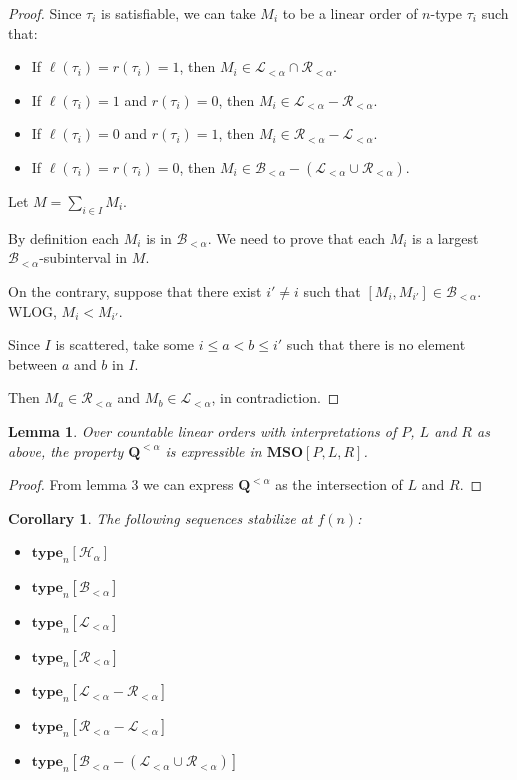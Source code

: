 \documentclass{article}
\newtheorem{corollary}{Corollary}
\newtheorem{lemma}{Lemma}
\newcommand{\brackets}[1]{\left[ {#1} \right]}
\newcommand{\mso}{\mathbf{MSO}}
\newcommand{\qq}{\mathbf{Q}}
\newcommand{\type}[2]{\mathbf{type}_{#1} \brackets{#2}}
\begin{document}
\begin{proof}
  Since $\tau_i$ is satisfiable, we can take $M_i$ to be a linear order of $n$-type
  $\tau_i$ such that:

  \begin{itemize}
    \item If $\ell(\tau_i) = r(\tau_i) = 1$, then $M_i \in \mathcal{L}_{< \alpha} \cap \mathcal{R}_{< \alpha}$.
    \item If $\ell(\tau_i) = 1$ and $r(\tau_i) = 0$, then $M_i \in \mathcal{L}_{< \alpha} - \mathcal{R}_{< \alpha}$.
    \item If $\ell(\tau_i) = 0$ and $r(\tau_i) = 1$, then $M_i \in \mathcal{R}_{< \alpha} - \mathcal{L}_{< \alpha}$.
    \item If $\ell(\tau_i) = r(\tau_i) = 0$, then $M_i \in \mathcal{B}_{< \alpha} - (\mathcal{L}_{< \alpha} \cup \mathcal{R}_{< \alpha})$.
  \end{itemize}

  Let $M = \sum_{i \in I} M_i$.

  By definition each $M_i$ is in $\mathcal{B}_{< \alpha}$. We need to prove
  that each $M_i$ is a largest $\mathcal{B}_{< \alpha}$-subinterval in $M$.

  On the contrary, suppose that there exist $i' \ne i$ such that $[M_i, M_{i'}] \in \mathcal{B}_{< \alpha}$.
  WLOG, $M_i < M_{i'}$.

  Since $I$ is scattered, take some $i \le a < b \le i'$ such that
  there is no element between $a$ and $b$ in $I$.

  Then $M_a \in \mathcal{R}_{< \alpha}$ and $M_b \in \mathcal{L}_{< \alpha}$, in contradiction.
\end{proof}

\begin{lemma}
  Over countable linear orders with interpretations of $P$, $L$ and $R$ as above, the property
  $\qq^{< \alpha}$ is expressible in $\mso[P, L, R]$.
\end{lemma}

\begin{proof}
  From lemma 3 we can express $\qq^{< \alpha}$ as the intersection
  of $L$ and $R$.
\end{proof}

\begin{corollary}
  The following sequences stabilize at $f(n)$:

  \begin{itemize}
    \item $\type{n}{\mathcal{H}_{\alpha}}$
    \item $\type{n}{\mathcal{B}_{< \alpha}}$
    \item $\type{n}{\mathcal{L}_{< \alpha}}$
    \item $\type{n}{\mathcal{R}_{< \alpha}}$
    \item $\type{n}{\mathcal{L}_{< \alpha} - \mathcal{R}_{< \alpha}}$
    \item $\type{n}{\mathcal{R}_{< \alpha} - \mathcal{L}_{< \alpha}}$
    \item $\type{n}{\mathcal{B}_{< \alpha} - (\mathcal{L}_{< \alpha} \cup \mathcal{R}_{< \alpha})}$
  \end{itemize}
\end{corollary}
\end{document}
